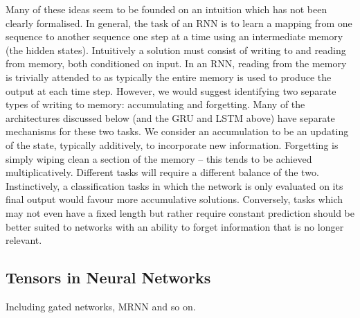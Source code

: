 Many of these ideas seem to be founded on an intuition which has not been clearly formalised. In
general, the task of an RNN is to learn a mapping from one sequence to another sequence one step at
a time using an intermediate memory (the hidden states). Intuitively a solution must consist of
writing to and reading from memory, both conditioned on input. In an RNN, reading from the memory is
trivially attended to as typically the entire memory is used to produce the output at each time
step. However, we would suggest identifying two separate types of writing to memory: accumulating
and forgetting. Many of the architectures discussed below (and the GRU and LSTM above) have separate
mechanisms for these two tasks. 
We consider an accumulation to be an updating of the state, typically additively, to incorporate
new information. Forgetting is simply wiping clean a section of the memory -- this tends to be
achieved multiplicatively. Different tasks will require a different balance of the two. Instinctively,
a classification tasks in which the network is only evaluated on its final output would favour
more accumulative solutions. Conversely, tasks which may not even have a fixed length but rather
require constant prediction should be better suited to networks with an ability to forget information
that is no longer relevant.

\subsection{Tensors in Neural Networks}
Including gated networks, MRNN and so on.

